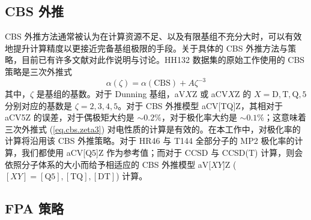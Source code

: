 \subsection{CBS 外推}
\label{sec.5.cbs}

CBS 外推方法通常被认为在计算资源不足、以及有限基组不充分大时，可以有效地提升计算精度以更接近完备基组极限的手段。关于具体的 CBS 外推方法与策略，目前已有许多文献对此作说明与讨论\cite{Nyden-Petersson.JCP.1981, Petersson-Mantzaris.JCP.1988, Dunning-Dunning.JCP.1989, Peterson-Dunning.JCP.1994, Jensen-Jensen.TCA.2005, Karton-Martin.TCA.2006, Truhlar-Truhlar.CPL.1998, Klopper-Kutzelnigg.JMST.1986, Kutzelnigg-Morgan.JCP.1992, Martin-Martin.CPL.1996, Helgaker-Noga.JCP.1997, Halkier-Wilson.CPL.1998, Halkier-Olsen.CPL.1999}。HH132 数据集的原始工作使用的 CBS 策略是三次外推式\cite{Hait-Head-Gordon.PCCP.2018}
\begin{equation}
    \label{eq.cbs.zeta3}
    \alpha(\zeta) = \alpha(\text{CBS}) + A \zeta^{-3}
\end{equation}
其中，$\zeta$ 是基组的基数。对于 Dunning 基组，aV$X$Z 或 aCV$X$Z 的 $X = \mathrm{D, T, Q, 5}$ 分别对应的基数是 $\zeta = 2, 3, 4, 5$。对于 CBS 外推模型 aCV[TQ]Z，其相对于 aCV5Z 的误差，对于偶极矩大约是 $\sim 0.2\%$\cite{Hait-Head-Gordon.JCTC.2018, Halkier-Joergensen.JCP.1999}，对于极化率大约是 $\sim 0.1\%$\cite{Hait-Head-Gordon.PCCP.2018}；这意味着三次外推式 (\ref{eq.cbs.zeta3}) 对电性质的计算是有效的。在本工作中，对极化率的计算将沿用该 CBS 外推策略。对于 HR46 与 T144 全部分子的 MP2 极化率的计算，我们都使用 aCV[Q5]Z 作为参考值；而对于 CCSD 与 CCSD(T) 计算，则会依照分子体系的大小而给予相适应的 CBS 外推模型 aV[$XY$]Z ($[XY] = \mathrm{[Q5], [TQ], [DT]}$) 计算。

\subsection{FPA 策略}

